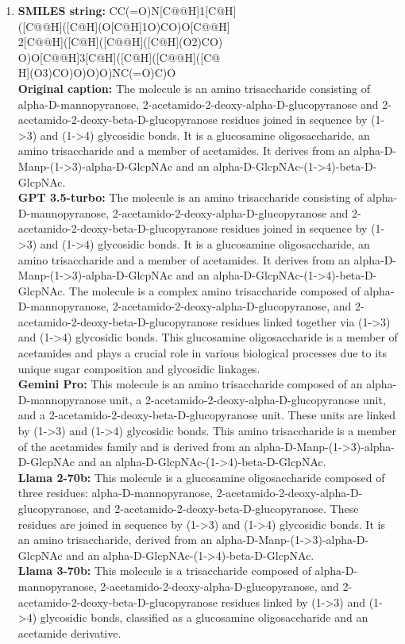 \begin{enumerate}[leftmargin=*]
    \item 
    \textbf{SMILES string:} CC(=O)N[C@@H]1[C@H]\\([C@@H]([C@H](O[C@H]1O)CO)O[C@@H]\\2[C@@H]([C@H]([C@@H]([C@H](O2)CO)\\O)O[C@@H]3[C@H]([C@H]([C@@H]([C@\\H](O3)CO)O)O)O)NC(=O)C)O \\
    \textbf{Original caption:} The molecule is an amino trisaccharide consisting of alpha-D-mannopyranose, 2-acetamido-2-deoxy-alpha-D-glucopyranose and 2-acetamido-2-deoxy-beta-D-glucopyranose residues joined in sequence by (1->3) and (1->4) glycosidic bonds. It is a glucosamine oligosaccharide, an amino trisaccharide and a member of acetamides. It derives from an alpha-D-Manp-(1->3)-alpha-D-GlcpNAc and an alpha-D-GlcpNAc-(1->4)-beta-D-GlcpNAc. \\
    \textbf{GPT 3.5-turbo:} The molecule is an amino trisaccharide consisting of alpha-D-mannopyranose, 2-acetamido-2-deoxy-alpha-D-glucopyranose and 2-acetamido-2-deoxy-beta-D-glucopyranose residues joined in sequence by (1->3) and (1->4) glycosidic bonds. It is a glucosamine oligosaccharide, an amino trisaccharide and a member of acetamides. It derives from an alpha-D-Manp-(1->3)-alpha-D-GlcpNAc and an alpha-D-GlcpNAc-(1->4)-beta-D-GlcpNAc.	The molecule is a complex amino trisaccharide composed of alpha-D-mannopyranose, 2-acetamido-2-deoxy-alpha-D-glucopyranose, and 2-acetamido-2-deoxy-beta-D-glucopyranose residues linked together via (1->3) and (1->4) glycosidic bonds. This glucosamine oligosaccharide is a member of acetamides and plays a crucial role in various biological processes due to its unique sugar composition and glycosidic linkages. \\
    \textbf{Gemini Pro:} This molecule is an amino trisaccharide composed of an alpha-D-mannopyranose unit, a 2-acetamido-2-deoxy-alpha-D-glucopyranose unit, and a 2-acetamido-2-deoxy-beta-D-glucopyranose unit. These units are linked by (1->3) and (1->4) glycosidic bonds. This amino trisaccharide is a member of the acetamides family and is derived from an alpha-D-Manp-(1->3)-alpha-D-GlcpNAc and an alpha-D-GlcpNAc-(1->4)-beta-D-GlcpNAc. \\
    \textbf{Llama 2-70b:} This molecule is a glucosamine oligosaccharide composed of three residues: alpha-D-mannopyranose, 2-acetamido-2-deoxy-alpha-D-glucopyranose, and 2-acetamido-2-deoxy-beta-D-glucopyranose. These residues are joined in sequence by (1->3) and (1->4) glycosidic bonds. It is an amino trisaccharide, derived from an alpha-D-Manp-(1->3)-alpha-D-GlcpNAc and an alpha-D-GlcpNAc-(1->4)-beta-D-GlcpNAc. \\
    \textbf{Llama 3-70b:} This molecule is a trisaccharide composed of alpha-D-mannopyranose, 2-acetamido-2-deoxy-alpha-D-glucopyranose, and 2-acetamido-2-deoxy-beta-D-glucopyranose residues linked by (1->3) and (1->4) glycosidic bonds, classified as a glucosamine oligosaccharide and an acetamide derivative. \\
\end{enumerate}

